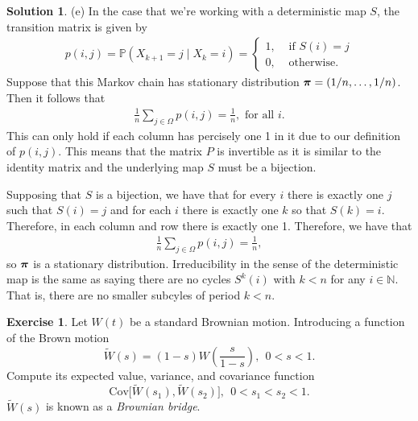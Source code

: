 \documentclass[12pt]{article}
\newcommand{\bbN}{\mathbb{N}}
\newcommand{\Prob}{\mathbb{P}}
\newcommand{\Cov}{\text{Cov}}
\theoremstyle{definition}
\newtheorem{exer}{Exercise}
\newtheorem{sol}{Solution}
\theoremstyle{remark}
\def\vpi{\mbox{\boldmath$\pi$}}
\begin{document}
\begin{sol}
    (e) In the case that we're working with a deterministic map $S$, the transition matrix is given by 
        \begin{align*}
        p(i,j) = \Prob( X_{k+1} = j \mid X_{k} = i ) 
        =
        \begin{cases}
            1, &\text{ if } S(i) = j\\
            0, &\text{ otherwise.}
        \end{cases}
    \end{align*}
    Suppose that this Markov chain has stationary distribution $\vpi = (1 / n , \ldots , 1 / n)$. Then it follows that
    \begin{align*}
        \frac{1}{n} \sum_{j\in \Omega} p(i,j) = \frac{1}{n}, \text{ for all } i.
    \end{align*}
    This can only hold if each column has percisely one 1 in it due to our definition of $p(i,j)$. This means that the matrix $P$ is invertible as it is similar to the identity matrix and the underlying map $S$ must be a bijection.

    Supposing that $S$ is a bijection, we have that for every $i$ there is exactly one $j$ such that $S(i) = j$ and for each $i$ there is exactly one $k$ so that $S(k) = i$. Therefore, in each column and row there is exactly one 1. Therefore, we have that
    \begin{align*}
            \frac{1}{n} \sum_{j\in \Omega} p(i,j) = \frac{1}{n},
    \end{align*}
    so $\vpi$ is a stationary distribution. Irreducibility in the sense of the deterministic map is the same as saying there are no cycles $S^{k}(i)$ with $k < n$ for any $i\in\bbN$. That is, there are no smaller subcyles of period $k < n$. 
\end{sol}

\newpage

\begin{exer}
 Let $W(t)$ be a standard Brownian motion.  Introducing a function
of the Brown motion 
\[
           \tilde{W}(s) = (1-s) W\left(\frac{s}{1-s}\right), \  \  0< s < 1.
\]
Compute its expected value, variance, and covariance function
\[
                     \Cov\Big[\tilde{W}(s_1),\tilde{W}(s_2)\Big], \  \
        0 < s_1 < s_2 < 1.
\]
$\tilde{W}(s)$ is known as a {\em Brownian bridge}.
\end{exer}
\end{document}
